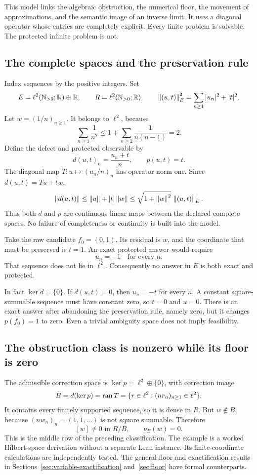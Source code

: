 \clearpage
{}\label{sec:escape}
This model links the algebraic obstruction, the numerical floor, the movement of approximations, and the semantic image of an inverse limit. It uses a diagonal operator whose entries are completely explicit. Every finite problem is solvable. The protected infinite problem is not.

\subsection{The complete spaces and the preservation rule}
Index sequences by the positive integers. Set
\[
 E=\ell^2(\mathbb N_{>0};\mathbb R)\oplus\mathbb R,\qquad
 R=\ell^2(\mathbb N_{>0};\mathbb R),\qquad
 \left\lVert(u,t)\right\rVert_E^2=\sum_{n\ge1}|u_n|^2+|t|^2.
\]
Let \(w=(1/n)_{n\ge1}\). It belongs to \(\ell^2\), because
\[
 \sum_{n\ge1}\frac1{n^2}
 \le1+\sum_{n\ge2}\frac1{n(n-1)}=2.
\]
Define the defect and protected observable by
\[
 d(u,t)_n=\frac{u_n+t}{n},\qquad p(u,t)=t.
\]
The diagonal map \(T:u\mapsto(u_n/n)_n\) has operator norm one. Since \(d(u,t)=Tu+tw\),
\[
 \left\lVert d(u,t)\right\rVert\le\left\lVert u\right\rVert+|t|\left\lVert w\right\rVert
 \le\sqrt{1+\left\lVert w\right\rVert^2}\,\left\lVert(u,t)\right\rVert_E.
\]
Thus both \(d\) and \(p\) are continuous linear maps between the declared complete spaces. No failure of completeness or continuity is built into the model.

Take the raw candidate \(f_0=(0,1)\). Its residual is \(w\), and the coordinate that must be preserved is \(t=1\). An exact protected answer would require
\[
 u_n=-1\quad\text{for every }n.
\]
That sequence does not lie in \(\ell^2\). Consequently no answer in \(E\) is both exact and protected.

In fact \(\ker d=\{0\}\). If \(d(u,t)=0\), then \(u_n=-t\) for every \(n\). A constant square-summable sequence must have constant zero, so \(t=0\) and \(u=0\). There is an exact answer after abandoning the preservation rule, namely zero, but it changes \(p(f_0)=1\) to zero. Even a trivial ambiguity space does not imply feasibility.

\subsection{The obstruction class is nonzero while its floor is zero}
The admissible correction space is \(\ker p=\ell^2\oplus\{0\}\), with correction image
\[
 B=d(\ker p)=\operatorname{ran} T
  =\{r\in\ell^2:(nr_n)_{n\ge1}\in\ell^2\}.
\]
It contains every finitely supported sequence, so it is dense in \(R\). But \(w\notin B\), because \((nw_n)_n=(1,1,\ldots)\) is not square summable. Therefore
\[
 [w]\ne0\text{ in }R/B,\qquad \nu_B(w)=0.
\]
This is the middle row of the preceding classification. The example is a worked Hilbert-space derivation without a separate Lean instance. Its finite-coordinate calculations are independently tested. The general floor and exactification results in Sections~\ref{sec:variable-exactification} and~\ref{sec:floor} have formal counterparts.

